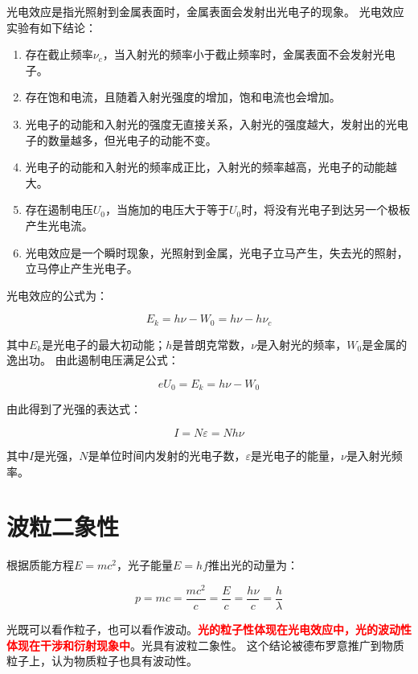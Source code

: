 \documentclass[12pt,a4paper]{article}
\begin{document}
\indent 光电效应是指光照射到金属表面时，金属表面会发射出光电子的现象。
光电效应实验有如下结论：
\begin{tcolorbox}[colback=yellow!20, colframe=red!75!black, title=考试重点]
    \begin{enumerate}
        \item 存在截止频率$\nu_c$，当入射光的频率小于截止频率时，金属表面不会发射光电子。
        \item 存在饱和电流，且随着入射光强度的增加，饱和电流也会增加。
        \item 光电子的动能和入射光的强度无直接关系，入射光的强度越大，发射出的光电子的数量越多，但光电子的动能不变。
        \item 光电子的动能和入射光的频率成正比，入射光的频率越高，光电子的动能越大。
        \item 存在遏制电压$U_0$，当施加的电压大于等于$U_0$时，将没有光电子到达另一个极板产生光电流。
        \item 光电效应是一个瞬时现象，光照射到金属，光电子立马产生，失去光的照射，立马停止产生光电子。
    \end{enumerate}
\end{tcolorbox}
光电效应的公式为：
\begin{tcolorbox}[colback=green!10, colframe=green!75!black, sharp corners]
    \begin{equation*}
        E_k = h \nu - W_0 = h \nu - h \nu_c
    \end{equation*}
\end{tcolorbox}
其中$E_k$是光电子的最大初动能；$h$是普朗克常数，$\nu$是入射光的频率，$W_0$是金属的逸出功。
由此遏制电压满足公式：
\begin{tcolorbox}[colback=green!10, colframe=green!75!black, sharp corners]
    \begin{equation*}
        eU_0 = E_k = h \nu - W_0
    \end{equation*}
\end{tcolorbox}
由此得到了光强的表达式：
\begin{tcolorbox}[colback=green!10, colframe=green!75!black, sharp corners]
    \begin{equation*}
        I = N\varepsilon=Nh\nu
    \end{equation*}
\end{tcolorbox}
其中$I$是光强，$N$是单位时间内发射的光电子数，$\varepsilon$是光电子的能量，$\nu$是入射光频率。
\pagebreak
\section{波粒二象性}
\indent 根据质能方程$E=mc^2$，光子能量$E=hf$推出光的动量为：
\begin{tcolorbox}[colback=green!10, colframe=green!75!black, sharp corners]
    \begin{equation*}
        p = mc = \frac{mc^2}c = \frac E c = \frac {h\nu} c = \frac{h}{\lambda}
    \end{equation*}
\end{tcolorbox}
光既可以看作粒子，也可以看作波动。\textbf{\textcolor{red}{光的粒子性体现在光电效应中，光的波动性体现在干涉和衍射现象中}}。光具有波粒二象性。
这个结论被德布罗意推广到物质粒子上，认为物质粒子也具有波动性。
\end{document}
